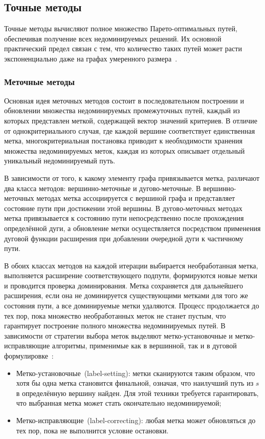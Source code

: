 \subsection{Точные методы}

Точные методы вычисляют полное множество Парето-оптимальных путей, обеспечивая получение всех недоминируемых решений. Их основной практический предел связан с тем, что количество таких путей может расти экспоненциально даже на графах умеренного размера~\cite{paixao2007, euler2024}.

\subsubsection{Меточные методы}

Основная идея меточных методов состоит в последовательном 
построении и обновлении множества недоминируемых промежуточных путей, каждый из которых 
представлен меткой, содержащей вектор значений критериев. В отличие от однокритериального случая, 
где каждой вершине соответствует единственная метка, многокритериальная постановка приводит 
к необходимости хранения множества недоминируемых меток, каждая из которых описывает отдельный уникальный недоминируемый путь.

В зависимости от того, к какому элементу графа привязывается метка, различают два класса методов: вершинно-меточные и дугово-меточные. В вершинно-меточных методах метка 
ассоциируется с вершиной графа и представляет состояние пути при достижении этой вершины. 
В дугово-меточных методах метка привязывается к состоянию пути непосредственно после прохождения 
определённой дуги, а обновление метки осуществляется посредством применения дуговой функции 
расширения при добавлении очередной дуги к частичному пути.

В обоих классах методов на каждой итерации выбирается 
необработанная метка, выполняется расширение соответствующего подпути, формируются новые метки 
и проводится проверка доминирования. Метка сохраняется для дальнейшего расширения, если она 
не доминируется существующими метками для того же состояния пути, а все доминируемые метки 
удаляются. Процесс продолжается до тех пор, пока множество необработанных меток не станет пустым, 
что гарантирует построение полного множества недоминируемых путей. В зависимости от стратегии 
выбора меток выделяют метко-установочные и метко-исправляющие алгоритмы, применимые как в 
вершинной, так и в дуговой формулировке~\cite{paixao2007,euler2024}:

\begin{itemize}
    \item Метко-установочные~(label-setting): метки сканируются таким образом, что хотя бы одна метка становится финальной, означая, что наилучший путь из \(s\) в определённую вершину найден. Для этой техники требуется гарантировать, что выбранная метка может стать окончательно недоминируемой;
    \item Метко-исправляющие~(label-correcting): любая метка может обновляться до тех пор, пока не выполнится условие остановки.
\end{itemize}

